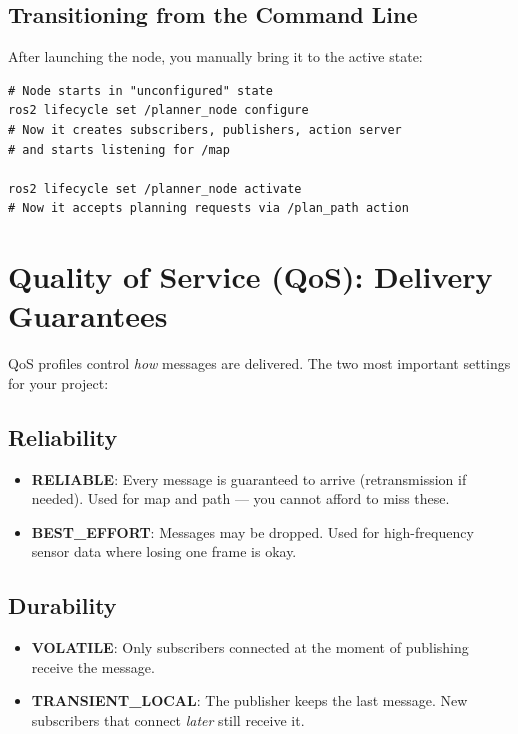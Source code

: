 \documentclass[12pt, a4paper]{article}
\begin{document}
\subsection{Transitioning from the Command Line}

After launching the node, you manually bring it to the active state:

\begin{lstlisting}[style=bash, caption={Lifecycle transitions}]
# Node starts in "unconfigured" state
ros2 lifecycle set /planner_node configure
# Now it creates subscribers, publishers, action server
# and starts listening for /map

ros2 lifecycle set /planner_node activate
# Now it accepts planning requests via /plan_path action
\end{lstlisting}


\section{Quality of Service (QoS): Delivery Guarantees}
\label{sec:qos}

QoS profiles control \emph{how} messages are delivered. The two most
important settings for your project:

\subsection{Reliability}

\begin{itemize}[nosep]
    \item \textbf{RELIABLE}: Every message is guaranteed to arrive
          (retransmission if needed). Used for map and path --- you cannot
          afford to miss these.
    \item \textbf{BEST\_EFFORT}: Messages may be dropped. Used for
          high-frequency sensor data where losing one frame is okay.
\end{itemize}

\subsection{Durability}

\begin{itemize}[nosep]
    \item \textbf{VOLATILE}: Only subscribers connected at the moment
          of publishing receive the message.
    \item \textbf{TRANSIENT\_LOCAL}: The publisher keeps the last
          message. New subscribers that connect \emph{later} still receive it.
\end{itemize}
\end{document}
